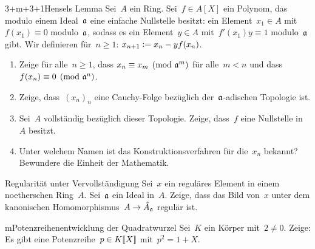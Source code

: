 \documentclass{uebblatt}
\begin{document}
\begin{aufgabe}{3+m+3+1}{Hensels Lemma}
Sei~$A$ ein Ring. Sei~$f \in A[X]$ ein
Polynom, das modulo einem Ideal~$\mathfrak{a}$ eine einfache Nullstelle besitzt: ein Element~$x_1
\in A$ mit~$f(x_1) \equiv 0$ modulo~$\mathfrak{a}$, sodass es ein Element~$y \in A$
mit~$f'(x_1) y \equiv 1$ modulo~$\mathfrak{a}$ gibt.
Wir definieren für~$n \geq 1$: $x_{n+1} \vcentcolon= x_n - y f(x_n)$.
\begin{enumerate}
\item Zeige für alle~$n \geq 1$, dass $x_n \equiv x_m \pmod{\mathfrak{a}^m}$ für
alle~$m < n$ und dass~$f(x_n) \equiv 0 \pmod{\mathfrak{a}^n}$.
\item Zeige, dass~$(x_n)_n$ eine Cauchy-Folge bezüglich der~$\mathfrak{a}$-adischen
Topologie ist.
\item Sei~$A$ vollständig bezüglich dieser Topologie. Zeige,
dass~$f$ eine Nullstelle in~$A$ besitzt.
\item Unter welchem Namen ist das Konstruktionsverfahren für die~$x_n$ bekannt?
Bewundere die Einheit der Mathematik.
\end{enumerate}
\end{aufgabe}

\begin{aufgabe}{2}{Regularität unter Vervollständigung}
Sei~$x$ ein reguläres Element in einem noetherschen Ring~$A$. Sei~$\mathfrak{a}$ ein
Ideal in~$A$. Zeige, dass das Bild von~$x$ unter dem kanonischen
Homomorphismus~$A \to \hat A_{\mathfrak{a}}$ regulär ist.
\end{aufgabe}

\begin{aufgabe}{m}{Potenzreihenentwicklung der Quadratwurzel}
Sei~$K$ ein Körper mit~$2 \neq 0$. Zeige: Es gibt eine Potenzreihe~$p \in
{K}\llbracket{X}\rrbracket$ mit~$p^2 = 1 + X$.
\end{aufgabe}
\end{document}
